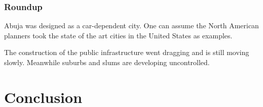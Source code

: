 \documentclass[twocolumn]{article}
\begin{document}
			
			\subsubsection{Roundup}
			Abuja was designed as a car-dependent city. One can assume the North American planners took the state of the art cities in the United States as examples.
			
			The construction of the public infrastructure went dragging and is still moving slowly. Meanwhile suburbs and slums are developing uncontrolled.
			


	\clearpage
	\section{Conclusion}

	

	
\end{document}
